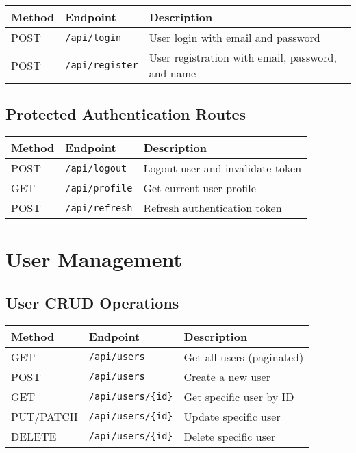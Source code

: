 \documentclass[12pt,a4paper]{article}
\begin{document}
\begin{longtable}{|p{}|p{}|p{}|}
\hline
\textbf{Method} & \textbf{Endpoint} & \textbf{Description} \\
\hline
\endhead

POST & \texttt{/api/login} & User login with email and password \\
POST & \texttt{/api/register} & User registration with email, password, and name \\
\hline
\end{longtable}

\subsection{Protected Authentication Routes}

\begin{longtable}{|p{}|p{}|p{}|}
\hline
\textbf{Method} & \textbf{Endpoint} & \textbf{Description} \\
\hline
\endhead

POST & \texttt{/api/logout} & Logout user and invalidate token \\
GET & \texttt{/api/profile} & Get current user profile \\
POST & \texttt{/api/refresh} & Refresh authentication token \\
\hline
\end{longtable}

\section{User Management}

\subsection{User CRUD Operations}

\begin{longtable}{|p{}|p{}|p{}|}
\hline
\textbf{Method} & \textbf{Endpoint} & \textbf{Description} \\
\hline
\endhead

GET & \texttt{/api/users} & Get all users (paginated) \\
POST & \texttt{/api/users} & Create a new user \\
GET & \texttt{/api/users/\{id\}} & Get specific user by ID \\
PUT/PATCH & \texttt{/api/users/\{id\}} & Update specific user \\
DELETE & \texttt{/api/users/\{id\}} & Delete specific user \\
\hline
\end{longtable}
\end{document}
